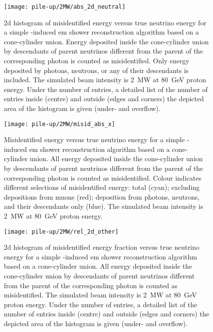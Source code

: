 \begin{figure}[htb]
	\centering
	\texttt{[image: pile-up/2MW/abs\_2d\_neutral]}
	\caption{\gls{2d} histogram of misidentified energy versus true neutrino energy for a simple \Pgpz-induced \gls{em} shower reconstruction algorithm based on a cone-cylinder union.
		Energy deposited inside the cone-cylinder union by descendants of parent neutrinos different from the parent of the corresponding \Pgpz photon is counted as misidentified.
		Only energy deposited by photons, neutrons, or any of their descendants is included.
		The simulated beam intensity is \SI{2}{\mega\watt} at \SI{80}{\giga\electronvolt} proton energy.
		Under the number of entries, a detailed list of the number of entries inside (centre) and outside (edges and corners) the depicted area of the histogram is given (under- and overflow).}
\end{figure}

\begin{figure}[htb]
	\centering
	\texttt{[image: pile-up/2MW/misid\_abs\_x]}
	\caption{Misidentified energy versus true neutrino energy for a simple \Pgpz-induced \gls{em} shower reconstruction algorithm based on a cone-cylinder union.
		All energy deposited inside the cone-cylinder union by descendants of parent neutrinos different from the parent of the corresponding \Pgpz photon is counted as misidentified.
		Colour indicates different selections of misidentified energy: total (cyan); excluding depositions from muons (red); deposition from photons, neutrons, and their descendants only (blue).
		The simulated beam intensity is \SI{2}{\mega\watt} at \SI{80}{\giga\electronvolt} proton energy.}
\end{figure}

\begin{figure}[htb]
	\centering
	\texttt{[image: pile-up/2MW/rel\_2d\_other]}
	\caption{\gls{2d} histogram of misidentified energy fraction versus true neutrino energy for a simple \Pgpz-induced \gls{em} shower reconstruction algorithm based on a cone-cylinder union.
		All energy deposited inside the cone-cylinder union by descendants of parent neutrinos different from the parent of the corresponding \Pgpz photon is counted as misidentified.
		The simulated beam intensity is \SI{2}{\mega\watt} at \SI{80}{\giga\electronvolt} proton energy.
		Under the number of entries, a detailed list of the number of entries inside (centre) and outside (edges and corners) the depicted area of the histogram is given (under- and overflow).}
\end{figure}

